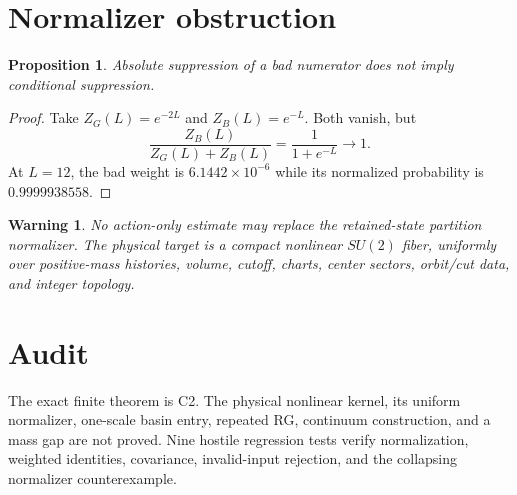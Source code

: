 \documentclass[11pt]{article}
\newtheorem{proposition}{Proposition}
\newtheorem{warning}{Warning}
\begin{document}
\section{Normalizer obstruction}
\begin{proposition}
Absolute suppression of a bad numerator does not imply conditional
suppression.
\end{proposition}
\begin{proof}
Take $Z_G(L)=e^{-2L}$ and $Z_B(L)=e^{-L}$.  Both vanish, but
\[
 \frac{Z_B(L)}{Z_G(L)+Z_B(L)}=\frac1{1+e^{-L}}\longrightarrow1.
\]
At $L=12$, the bad weight is $6.1442\times10^{-6}$ while its normalized
probability is $0.9999938558$.
\end{proof}

\begin{warning}
No action-only estimate may replace the retained-state partition normalizer.
The physical target is a compact nonlinear $SU(2)$ fiber, uniformly over
positive-mass histories, volume, cutoff, charts, center sectors, orbit/cut
data, and integer topology.
\end{warning}

\section{Audit}
The exact finite theorem is C2.  The physical nonlinear kernel, its uniform
normalizer, one-scale basin entry, repeated RG, continuum construction, and a
mass gap are not proved.  Nine hostile regression tests verify normalization,
weighted identities, covariance, invalid-input rejection, and the collapsing
normalizer counterexample.
\end{document}

